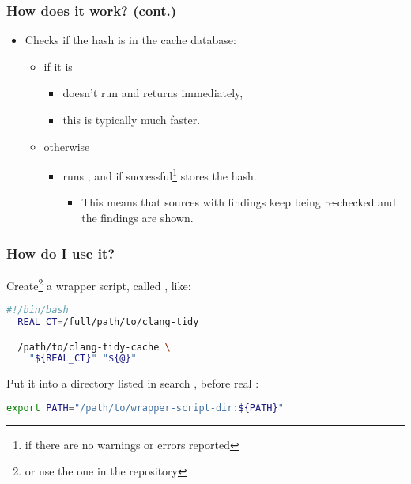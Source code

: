 \documentclass[compress,table,xcolor=table]{beamer}
\begin{document}
\begin{frame}
  \frametitle{How does it work? (cont.)}
    \LARGE
    \begin{itemize}
        \item Checks if the hash is in the cache database:
        \begin{itemize}
            \Large
            \item if it is
            \begin{itemize}
            \item doesn't run  and returns immediately,
            \item this is typically {\larger much} faster.
            \end{itemize}
            \item otherwise
            \begin{itemize}
            \item runs , and if
                successful\footnote{if there are no warnings or errors reported}
                stores the hash.
            \begin{itemize}
            \large
            \item This means that {\larger sources with findings keep being
                re-checked} and the findings are shown.
            \end{itemize}
            \end{itemize}
        \end{itemize}
    \end{itemize}
\end{frame}
\begin{frame}[fragile]
  \frametitle{How do I use it?}
  \Large
  Create\footnote{or use the one in the repository} a wrapper script,
    called , like:
  \begin{lstlisting}[language=bash]
  #!/bin/bash
  REAL_CT=/full/path/to/clang-tidy

  /path/to/clang-tidy-cache \
    "${REAL_CT}" "${@}"
  \end{lstlisting}
  Put it into a directory listed in search , before real
  \cmdname{clang-tidy}:
  \begin{lstlisting}[language=bash]
  export PATH="/path/to/wrapper-script-dir:${PATH}"
  \end{lstlisting}
\end{frame}
\end{document}
